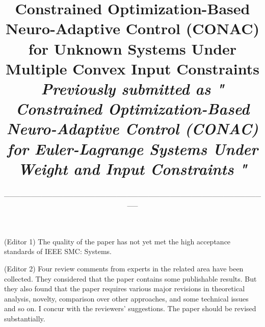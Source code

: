\documentclass[12pt,english]{reviewresponse}
\title{
  Constrained Optimization-Based Neuro-Adaptive Control (CONAC) for Unknown Systems Under Multiple Convex Input Constraints
  \\
  \textit{
  \small{
    Previously submitted as "
	  Constrained Optimization-Based Neuro-Adaptive Control (CONAC) for Euler-Lagrange Systems Under Weight and Input Constraints
  "
  }
  }
}
\author{
	\_\_\_\_\_\_\_\_\_\_\_\_\_\_\_\_\_\_\_\_\_\_\_\_\_\_\_\_\_\_\_\_\_\_\_\_\_\_\_\_\_\_\_\_\_\_\_\_\_\_
}
\begin{document}
\maketitle



% 

\newpage
\tableofcontents

\editor

\begin{generalcomment}

  (Editor 1) The quality of the paper has not yet met the high acceptance standards of IEEE SMC: Systems.

  (Editor 2) Four review comments from experts in the related area have been collected. They considered that the paper contains some publishable results. But they also found that the paper requires various major revisions in theoretical analysis, novelty, comparison over other approaches, and some technical issues and so on. I concur with the reviewers' suggestions. The paper should be revised substantially.

\end{generalcomment}
\end{document}
